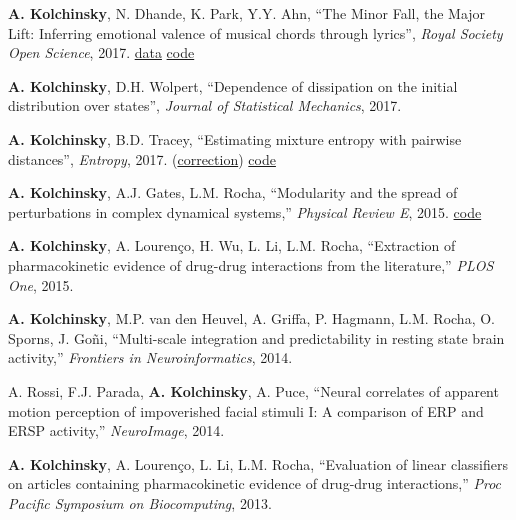 \textbf{A. Kolchinsky}, N. Dhande, K. Park, Y.Y. Ahn, ``The Minor Fall, the Major Lift: Inferring emotional valence of musical chords through lyrics'', \emph{Royal Society Open Science}, 2017. 
\href{https://doi.org/10.6084/m9.figshare.5413060.v1.}{data} 
\href{https://github.com/artemyk/chordsentiment}{code}

\textbf{A. Kolchinsky}, D.H. Wolpert, ``Dependence of dissipation on the initial distribution over states'',
\emph{Journal of Statistical Mechanics}, 2017. 

\textbf{A. Kolchinsky}, B.D. Tracey, ``Estimating mixture entropy with pairwise distances'', \emph{Entropy}, 2017.
(\href{https://www.mdpi.com/1099-4300/19/11/588}{correction}) 
\href{https://github.com/btracey/mixent/}{code}


\textbf{A. Kolchinsky}, A.J. Gates, L.M. Rocha, ``Modularity and
the spread of perturbations in complex dynamical systems,'' \emph{Physical Review E}, 2015. 
\href{https://github.com/artemyk/perturbationmodularity/}{code}

\textbf{A. Kolchinsky}, A. Lourenço, H. Wu, L. Li, L.M. Rocha,
``Extraction of pharmacokinetic evidence of drug-drug interactions
from the literature,'' \emph{PLOS One}, 2015. 

\textbf{A. Kolchinsky}, M.P. van den Heuvel, A. Griffa, P. Hagmann, L.M. Rocha, O. Sporns, J. Goñi, ``Multi-scale
integration and predictability in resting state brain activity,'' 
\emph{Frontiers in Neuroinformatics}, 2014. 

A. Rossi, F.J. Parada, \textbf{A. Kolchinsky}, A. Puce, ``Neural correlates of apparent motion perception of impoverished facial stimuli I: A comparison of ERP and ERSP activity,'' \emph{NeuroImage}, 2014. 

\textbf{A. Kolchinsky}, A. Lourenço, L. Li, L.M. Rocha, ``Evaluation of linear classifiers on articles containing pharmacokinetic evidence of drug-drug interactions,'' \emph{Proc Pacific Symposium on Biocomputing}, 2013. 


